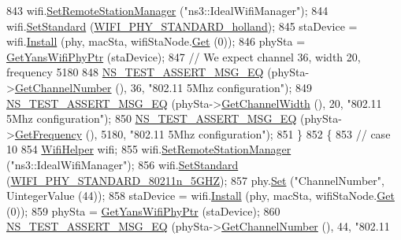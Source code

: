 \begin{DoxyCode}
843     wifi.\hyperlink{classns3_1_1WifiHelper_a3d01b178aeb2de246ab5a3aa5638ce24}{SetRemoteStationManager} (\textcolor{stringliteral}{"ns3::IdealWifiManager"});
844     wifi.\hyperlink{classns3_1_1WifiHelper_aa54f3e61527ef8de318d310045bc5dfd}{SetStandard} (\hyperlink{group__wifi_gga1299834f4e1c615af3ca738033b76a49aca926d77ddca0fc6d8cdcb190b2e520e}{WIFI\_PHY\_STANDARD\_holland});
845     staDevice = wifi.\hyperlink{classns3_1_1WifiHelper_a451b3d33fa1497c22f06c5451f57a127}{Install} (phy, macSta, wifiStaNode.\hyperlink{classns3_1_1NodeContainer_a9ed96e2ecc22e0f5a3d4842eb9bf90bf}{Get} (0));
846     phySta = \hyperlink{classSetChannelFrequencyTest_aa30a0a39f98c2d825152681ba8b9f4e1}{GetYansWifiPhyPtr} (staDevice);
847     \textcolor{comment}{// We expect channel 36, width 20, frequency 5180}
848     \hyperlink{group__testing_ga2a9d78cffb3db8e867c35fff0b698cf5}{NS\_TEST\_ASSERT\_MSG\_EQ} (phySta->\hyperlink{classns3_1_1WifiPhy_a5cf0ccf06109ace61db51c83e91b7e8d}{GetChannelNumber} (), 36, \textcolor{stringliteral}{"802.11
       5Mhz configuration"});
849     \hyperlink{group__testing_ga2a9d78cffb3db8e867c35fff0b698cf5}{NS\_TEST\_ASSERT\_MSG\_EQ} (phySta->\hyperlink{classns3_1_1WifiPhy_a4a5d5009b3b3308f2baeed42a2007189}{GetChannelWidth} (), 20, \textcolor{stringliteral}{"802.11 5Mhz
       configuration"});
850     \hyperlink{group__testing_ga2a9d78cffb3db8e867c35fff0b698cf5}{NS\_TEST\_ASSERT\_MSG\_EQ} (phySta->\hyperlink{classns3_1_1WifiPhy_ad2508d94faf22d690d6b8b4367934fd1}{GetFrequency} (), 5180, \textcolor{stringliteral}{"802.11 5Mhz
       configuration"});
851   \}
852   \{
853     \textcolor{comment}{// case 10}
854     \hyperlink{classns3_1_1WifiHelper}{WifiHelper} wifi;
855     wifi.\hyperlink{classns3_1_1WifiHelper_a3d01b178aeb2de246ab5a3aa5638ce24}{SetRemoteStationManager} (\textcolor{stringliteral}{"ns3::IdealWifiManager"});
856     wifi.\hyperlink{classns3_1_1WifiHelper_aa54f3e61527ef8de318d310045bc5dfd}{SetStandard} (\hyperlink{group__wifi_gga1299834f4e1c615af3ca738033b76a49aaabe94a0be4668583c42595437b4a6c0}{WIFI\_PHY\_STANDARD\_80211n\_5GHZ});
857     phy.\hyperlink{classns3_1_1WifiPhyHelper_a2527d6d7b29f717fd7436166c5f05f1a}{Set} (\textcolor{stringliteral}{"ChannelNumber"}, UintegerValue (44));
858     staDevice = wifi.\hyperlink{classns3_1_1WifiHelper_a451b3d33fa1497c22f06c5451f57a127}{Install} (phy, macSta, wifiStaNode.\hyperlink{classns3_1_1NodeContainer_a9ed96e2ecc22e0f5a3d4842eb9bf90bf}{Get} (0));
859     phySta = \hyperlink{classSetChannelFrequencyTest_aa30a0a39f98c2d825152681ba8b9f4e1}{GetYansWifiPhyPtr} (staDevice);
860     \hyperlink{group__testing_ga2a9d78cffb3db8e867c35fff0b698cf5}{NS\_TEST\_ASSERT\_MSG\_EQ} (phySta->\hyperlink{classns3_1_1WifiPhy_a5cf0ccf06109ace61db51c83e91b7e8d}{GetChannelNumber} (), 44, \textcolor{stringliteral}{"802.11
}
\end{DoxyCode}
